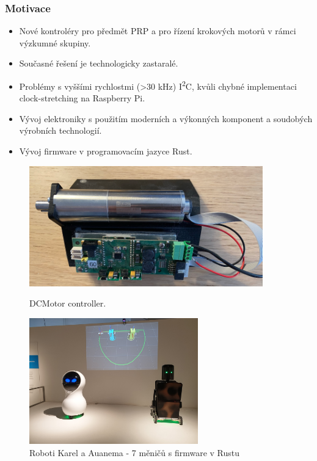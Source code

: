 \documentclass[%
  12pt,       				%
	t,                  %
	aspectratio=1610,   %
	unicode,						%
]{beamer}				    	%
\begin{document}
\begin{frame}
	\frametitle{Motivace}
	\begin{itemize}
		\item Nové kontroléry pro předmět PRP a pro řízení krokových motorů v rámci výzkumné skupiny.
		\item Současné řešení je technologicky zastaralé.
		\item Problémy s vyššími rychlostmi (>30 kHz) I\textsuperscript{2}C, kvůli chybné implementaci clock-stretching na Raspberry Pi.
		\item Vývoj elektroniky s použitím moderních a výkonných komponent a soudobých výrobních technologií.
		\item Vývoj firmware v programovacím jazyce Rust.
	\end{itemize}
	\begin{figure}[H]
		\begin{minipage}[t]{0.45\textwidth}
			\centering
			\includegraphics[angle=180,width=0.9\textwidth]{../Thesis/obrazky/dcmotor}
			\caption{DCMotor controller.}
			\label{fig:fliplink_orig}
		\end{minipage}\hfill
		\begin{minipage}[t]{0.45\textwidth}
			\centering
			\includegraphics[angle=180,width=0.65\textwidth]{../Thesis/obrazky/karlozo_auanemozo}
			\caption{Roboti Karel a Auanema - 7 měničů s firmware v Rustu}
			\label{fig:fliplink_changed}
		\end{minipage}
	\end{figure}
\end{frame}
\end{document}
